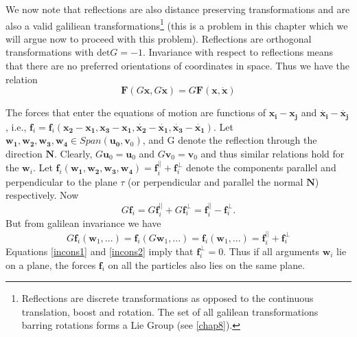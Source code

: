 \begin{enumerate}
We now note that reflections are also distance preserving transformations and are also a valid galiliean transformations\footnote{Reflections are discrete transformations as opposed to the continuous translation, boost and rotation. The set of all galilean transformations barring rotations forms a Lie Group (see \ref{chap8}).} (this is a problem in this chapter which we will argue now to proceed with this problem). Reflections are orthogonal transformations with $\mathrm{det}G = -1$. Invariance  with respect to reflections means that there are no preferred orientations of coordinates in space. Thus we have the relation 
\begin{equation}
	\mathbf{F}(G\mathbf{x},G\dot{\mathbf{x}}) = G \mathbf{F}(\mathbf{x},\dot{\mathbf{x}})
\end{equation}

The forces that enter the equations of motion are functions of $\mathbf{x_i}-\mathbf{x_j}$ and $\dot{\mathbf{x_i}}-\dot{\mathbf{x_j}}$ , i.e., $ \mathbf{f}_i  = \mathbf{f}_i(\mathbf{x_2}-\mathbf{x_1},\mathbf{x_3}-\mathbf{x_1},\dot{\mathbf{x_2}}-\dot{\mathbf{x_1}},\dot{\mathbf{x_3}}-\dot{\mathbf{x_1}})$. Let $\mathbf{w_1}, \mathbf{w_2}, \mathbf{w_3}, \mathbf{w_4}\in \textit{Span}(\mathbf{u_0}, \mathbf{v}_0)$, and G denote the reflection through the direction $\mathbf{N}$. Clearly, $G\mathbf{u}_0 = \mathbf{u}_0$ and $G\mathbf{v}_0 = \mathbf{v}_0$ and thus similar relations hold for the $\mathbf{w}_i$. Let $\mathbf{f}_i(\mathbf{w_1}, \mathbf{w_2}, \mathbf{w_3}, \mathbf{w_4}) = \mathbf{f}_{i}^{||}+ \mathbf{f}_{i}^{\perp}$ denote the components parallel and perpendicular to the plane $\tau$ (or perpendicular and parallel the normal $\mathbf{N}$) respectively. Now
\begin{equation}\label{incons1}
	G \mathbf{f}_i = G\mathbf{f}_{i}^{||} + G \mathbf{f}_{i}^{\perp} = \mathbf{f}_{i}^{||} -  \mathbf{f}_{i}^{\perp}.
\end{equation}
But from galilean invariance we have
\begin{equation}\label{incons2}
	G \mathbf{f}_i(\mathbf{w}_1,...) = \mathbf{f}_i(G\mathbf{w}_1,...) = \mathbf{f}_i(\mathbf{w}_1,...) = \mathbf{f}_{i}^{||}+ \mathbf{f}_{i}^{\perp}
\end{equation}
Equations \eqref{incons1} and \eqref{incons2} imply that $ \mathbf{f}_{i}^{\perp} = 0$. Thus if all arguments $\mathbf{w}_i$ lie on a plane, the forces $\mathbf{f}_i$ on all the particles also lies on the same plane.  \par


\end{enumerate}
